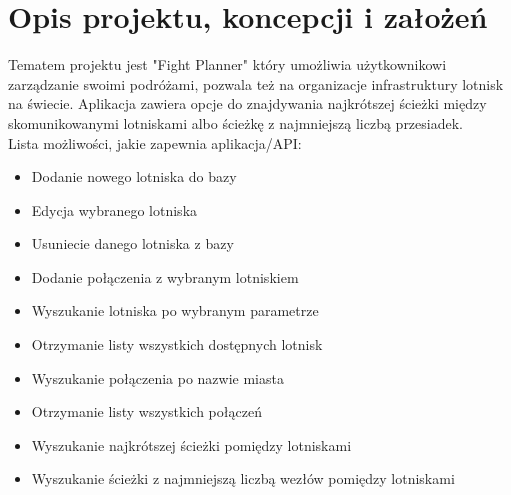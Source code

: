 \documentclass[12pt]{article}
\begin{document}
\clearpage
\newpage
\restoregeometry
{}

\section{Opis projektu, koncepcji i założeń}
Tematem projektu jest "Fight Planner" który umożliwia użytkownikowi zarządzanie swoimi podróżami, pozwala też na organizacje infrastruktury lotnisk na świecie. Aplikacja zawiera opcje do znajdywania najkrótszej ścieżki między skomunikowanymi lotniskami albo ścieżkę z najmniejszą liczbą przesiadek.\\
Lista możliwości, jakie zapewnia aplikacja/API:
\begin{itemize}
    \item Dodanie nowego lotniska do bazy
    \item Edycja wybranego lotniska
    \item Usuniecie danego lotniska z bazy
    \item Dodanie połączenia z wybranym lotniskiem
    \item Wyszukanie lotniska po wybranym parametrze
    \item Otrzymanie listy wszystkich dostępnych lotnisk
    \item Wyszukanie połączenia po nazwie miasta
    \item Otrzymanie listy wszystkich połączeń
    \item Wyszukanie najkrótszej ścieżki pomiędzy lotniskami
    \item Wyszukanie ścieżki z najmniejszą liczbą wezłów pomiędzy lotniskami
\end{itemize}
\end{document}
